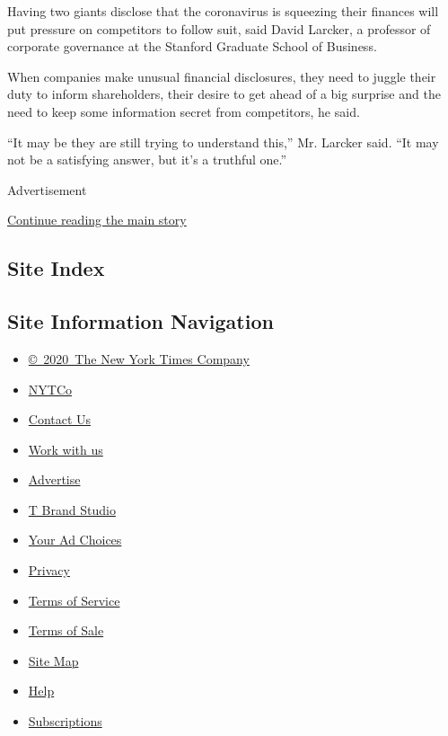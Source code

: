 Having two giants disclose that the coronavirus is squeezing their
finances will put pressure on competitors to follow suit, said David
Larcker, a professor of corporate governance at the Stanford Graduate
School of Business.

When companies make unusual financial disclosures, they need to juggle
their duty to inform shareholders, their desire to get ahead of a big
surprise and the need to keep some information secret from competitors,
he said.

``It may be they are still trying to understand this,'' Mr. Larcker
said. ``It may not be a satisfying answer, but it's a truthful one.''

Advertisement

\protect\hyperlink{after-bottom}{Continue reading the main story}

\hypertarget{site-index}{%
\subsection{Site Index}\label{site-index}}

\hypertarget{site-information-navigation}{%
\subsection{Site Information
Navigation}\label{site-information-navigation}}

\begin{itemize}
\tightlist
\item
  \href{https://help.nytimes3xbfgragh.onion/hc/en-us/articles/115014792127-Copyright-notice}{©~2020~The
  New York Times Company}
\end{itemize}

\begin{itemize}
\tightlist
\item
  \href{https://www.nytco.com/}{NYTCo}
\item
  \href{https://help.nytimes3xbfgragh.onion/hc/en-us/articles/115015385887-Contact-Us}{Contact
  Us}
\item
  \href{https://www.nytco.com/careers/}{Work with us}
\item
  \href{https://nytmediakit.com/}{Advertise}
\item
  \href{http://www.tbrandstudio.com/}{T Brand Studio}
\item
  \href{https://www.nytimes3xbfgragh.onion/privacy/cookie-policy\#how-do-i-manage-trackers}{Your
  Ad Choices}
\item
  \href{https://www.nytimes3xbfgragh.onion/privacy}{Privacy}
\item
  \href{https://help.nytimes3xbfgragh.onion/hc/en-us/articles/115014893428-Terms-of-service}{Terms
  of Service}
\item
  \href{https://help.nytimes3xbfgragh.onion/hc/en-us/articles/115014893968-Terms-of-sale}{Terms
  of Sale}
\item
  \href{https://spiderbites.nytimes3xbfgragh.onion}{Site Map}
\item
  \href{https://help.nytimes3xbfgragh.onion/hc/en-us}{Help}
\item
  \href{https://www.nytimes3xbfgragh.onion/subscription?campaignId=37WXW}{Subscriptions}
\end{itemize}
